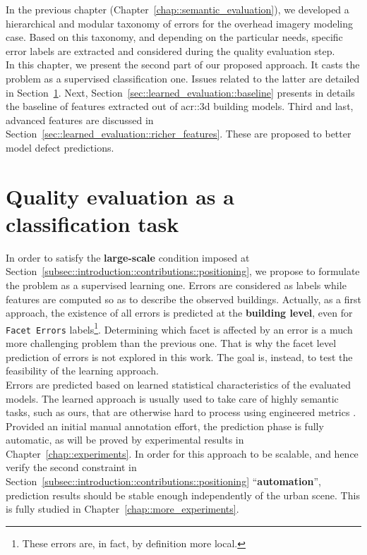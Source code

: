 \minitoc

\vfill

In the previous chapter (Chapter~\ref{chap::semantic_evaluation}), we developed a hierarchical and modular taxonomy of errors for the overhead imagery modeling case.
Based on this taxonomy, and depending on the particular needs, specific error labels are extracted and considered during the quality evaluation step.\\

In this chapter, we present the second part of our proposed approach.
It casts the problem as a supervised classification one.
Issues related to the latter are detailed in Section~\ref{sec::learned_evaluation::classification}.
Next, Section~\ref{sec::learned_evaluation::baseline} presents in details the baseline of features extracted out of \gls{acr::3d} building models.
Third and last, advanced features are discussed in Section~\ref{sec::learned_evaluation::richer_features}.
These are proposed to better model defect predictions.

\clearpage

\section{Quality evaluation as a classification task}
    \label{sec::learned_evaluation::classification}
    In order to satisfy the \textbf{large-scale} condition imposed at Section~\ref{subsec::introduction::contributions::positioning}, we propose to formulate the problem as a supervised learning one.
    Errors are considered as labels while features are computed so as to describe the observed buildings.
    Actually, as a first approach, the existence of all errors is predicted at the \textbf{building level}, even for \texttt{Facet Errors} labels\footnote{These errors are, in fact, by definition more local.}.
    Determining which facet is affected by an error is a much more challenging problem than the previous one.
    That is why the facet level prediction of errors is not explored in this work.
    The goal is, instead, to test the feasibility of the learning approach.\\

    Errors are predicted based on learned statistical characteristics of the evaluated models.
    The learned approach is usually used to take care of highly semantic tasks, such as ours, that are otherwise hard to process using engineered metrics \addref.\\
    Provided an initial manual annotation effort, the prediction phase is fully automatic, as will be proved by experimental results in Chapter~\ref{chap::experiments}.
    In order for this approach to be scalable, and hence verify the second constraint in Section~\ref{subsec::introduction::contributions::positioning} ``\textbf{automation}'', prediction results should be stable enough independently of the urban scene.
    This is fully studied in Chapter~\ref{chap::more_experiments}.\\

